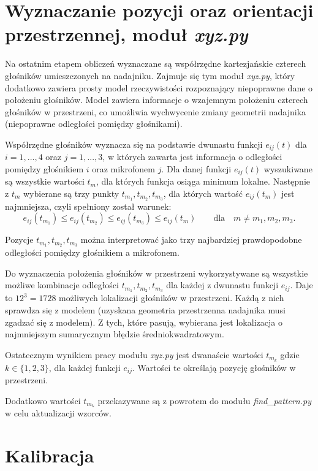  
\section{Wyznaczanie pozycji oraz orientacji przestrzennej, moduł \textit{xyz.py}}

Na ostatnim etapem obliczeń wyznaczane są współrzędne kartezjańskie czterech głośników umieszczonych na nadajniku.
Zajmuje się tym moduł \textit{xyz.py}, który dodatkowo zawiera prosty model rzeczywistości
rozpoznający niepoprawne dane o położeniu głośników.
Model zawiera informacje o wzajemnym położeniu czterech głośników w przestrzeni, co umożliwia wychwycenie 
zmiany geometrii nadajnika (niepoprawne odległości pomiędzy głośnikami).

Współrzędne głośników wyznacza się na podstawie dwunastu funkcji $e_{ij}(t)$ dla $i=1, ..., 4$ oraz $j=1, ..., 3$,
w których zawarta jest informacja o odległości pomiędzy głośnikiem $i$ oraz mikrofonem $j$.
Dla danej funkcji $e_{ij}(t)$ wyszukiwane są wszystkie wartości $t_m$, dla których funkcja osiąga minimum lokalne.
Następnie z $t_m$ wybierane są trzy punkty $t_{m_1}, t_{m_2}, t_{m_3}$, dla których wartość $e_{ij}(t_m)$ jest najmniejsza,
czyli spełniony został warunek:
\[ e_{ij}(t_{m_1}) \leq e_{ij}(t_{m_2}) \leq e_{ij}(t_{m_3}) \leq e_{ij}(t_m) \qquad \text{dla} \quad m \ne m_1,m_2,m_3. \]

Pozycje $t_{m_1}, t_{m_2}, t_{m_3}$  można interpretować jako trzy najbardziej prawdopodobne odległości 
pomiędzy głośnikiem a mikrofonem.

Do wyznaczenia położenia głośników w przestrzeni wykorzystywane są wszystkie możliwe kombinacje 
odległości $t_{m_1}, t_{m_2}, t_{m_3}$ dla każdej z dwunastu funkcji $e_{ij}$.
Daje to $12^3 = 1728$ możliwych lokalizacji głośników w przestrzeni. 
Każdą z nich sprawdza się z modelem (uzyskana geometria przestrzenna nadajnika musi zgadzać się z
modelem). Z tych, które pasują, wybierana jest lokalizacja o najmniejszym sumarycznym błędzie średniokwadratowym.

Ostatecznym wynikiem pracy modułu \textit{xyz.py} jest dwanaście wartości $t_{m_k}$ gdzie $k \in \{1,2,3\}$, 
dla każdej funkcji $e_{ij}$. Wartości te określają pozycję głośników w przestrzeni.

Dodatkowo wartości $t_{m_k}$ przekazywane są z powrotem do modułu \textit{find\_pattern.py} w celu aktualizacji wzorców.


\section{Kalibracja}

